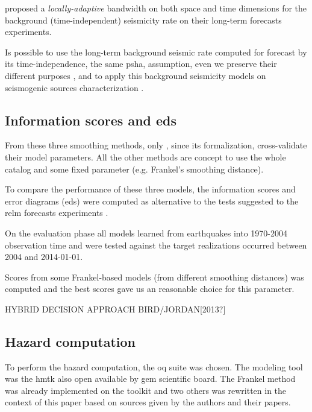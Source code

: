 \documentclass[draft, grl]{agutex}
\begin{document}
\begin{article}
\citet{helmstetter_2012} proposed a \emph{locally-adaptive} bandwidth on both space and time dimensions for the background (time-independent) seismicity rate on their long-term forecasts experiments.

Is possible to use the long-term background seismic rate computed for forecast by its time-independence, the same \gls{psha}, assumption, even we preserve their different purposes \citep{marzocchi_2011}, and to apply this background seismicity models on seismogenic sources characterization \citep{weatherill_pagani_2014}.


\subsection{Information scores and \glspl{ed}}

From these three smoothing methods, only \cite{helmstetter_2012}, since its formalization, cross-validate their model parameters. All the other methods are concept to use the whole catalog and some fixed parameter (e.g. Frankel's smoothing distance).

To compare the performance of these three models, the information scores and error diagrams (\glspl{ed}) \citep{molchan_1992, kagan_2007, kagan_2009} were computed as alternative to the tests suggested to the \gls{relm} forecasts experiments \citep{schorlemmer_2007}.

On the evaluation phase all models learned from earthquakes into 1970-2004 observation time and were tested against the target realizations occurred between 2004 and 2014-01-01.

Scores from some Frankel-based models (from different smoothing distances) was computed and the best scores gave us an reasonable choice for this parameter.

HYBRID DECISION APPROACH BIRD/JORDAN[2013?]


\subsection{Hazard computation}

To perform the hazard computation, the \acrfull{oq} suite \citep{pagani_2014} was chosen. The modeling tool was the \gls{hmtk} also open available by \gls{gem} scientific board. The Frankel method was already implemented on the toolkit and two others was rewritten in the context of this paper based on sources given by the authors and their papers. %


\end{article}
\end{document}

